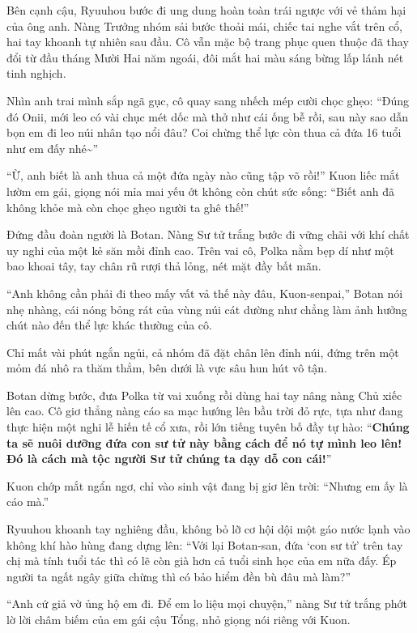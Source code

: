 \documentclass[../main.tex]{subfiles}
\begin{document}
Bên cạnh cậu, Ryuuhou bước đi ung dung hoàn toàn trái ngược với vẻ thảm hại của ông anh. Nàng Trưởng nhóm sải bước thoải mái, chiếc tai nghe vắt trên cổ, hai tay khoanh tự nhiên sau đầu. Cô vẫn mặc bộ trang phục quen thuộc đã thay đổi từ đầu tháng Mười Hai năm ngoái, đôi mắt hai màu sáng bừng lấp lánh nét tinh nghịch.

Nhìn anh trai mình sắp ngã gục, cô quay sang nhếch mép cười chọc ghẹo: ``Đúng đó Onii, mới leo có vài chục mét dốc mà thở như cái ống bễ rồi, sau này sao dẫn bọn em đi leo núi nhân tạo nổi đâu? Coi chừng thể lực còn thua cả đứa 16 tuổi như em đấy nhé\~{}''

``Ừ, anh biết là anh thua cả một đứa ngày nào cũng tập võ rồi!'' Kuon liếc mắt lườm em gái, giọng nói mỉa mai yếu ớt không còn chút sức sống: ``Biết anh đã không khỏe mà còn chọc ghẹo người ta ghê thế!''

Đứng đầu đoàn người là Botan. Nàng Sư tử trắng bước đi vững chãi với khí chất uy nghi của một kẻ săn mồi đỉnh cao. Trên vai cô, Polka nằm bẹp dí như một bao khoai tây, tay chân rũ rượi thả lỏng, nét mặt đầy bất mãn.

``Anh không cần phải đi theo mấy vất vả thế này đâu, Kuon-senpai,'' Botan nói nhẹ nhàng, cái nóng bỏng rát của vùng núi cát dường như chẳng làm ảnh hưởng chút nào đến thể lực khác thường của cô.

Chỉ mất vài phút ngắn ngủi, cả nhóm đã đặt chân lên đỉnh núi, đứng trên một mỏm đá nhô ra thăm thẳm, bên dưới là vực sâu hun hút vô tận.

Botan dừng bước, đưa Polka từ vai xuống rồi dùng hai tay nâng nàng Chủ xiếc lên cao. Cô giơ thẳng nàng cáo sa mạc hướng lên bầu trời đỏ rực, tựa như đang thực hiện một nghi lễ hiến tế cổ xưa, rồi lớn tiếng tuyên bố đầy tự hào: ``\textbf{Chúng ta sẽ nuôi dưỡng đứa con sư tử này bằng cách để nó tự mình leo lên! Đó là cách mà tộc người Sư tử chúng ta dạy dỗ con cái!}''

Kuon chớp mắt ngẩn ngơ, chỉ vào sinh vật đang bị giơ lên trời: ``Nhưng em ấy là cáo mà.''

Ryuuhou khoanh tay nghiêng đầu, không bỏ lỡ cơ hội dội một gáo nước lạnh vào không khí hào hùng đang dựng lên: ``Với lại Botan-san, đứa `con sư tử' trên tay chị mà tính tuổi tác thì có lẽ còn già hơn cả tuổi sinh học của em nữa đấy. Ép người ta ngất ngây giữa chừng thì có bảo hiểm đền bù đâu mà làm?''

``Anh cứ giả vờ ủng hộ em đi. Để em lo liệu mọi chuyện,'' nàng Sư tử trắng phớt lờ lời châm biếm của em gái cậu Tổng, nhỏ giọng nói riêng với Kuon.
\end{document}
